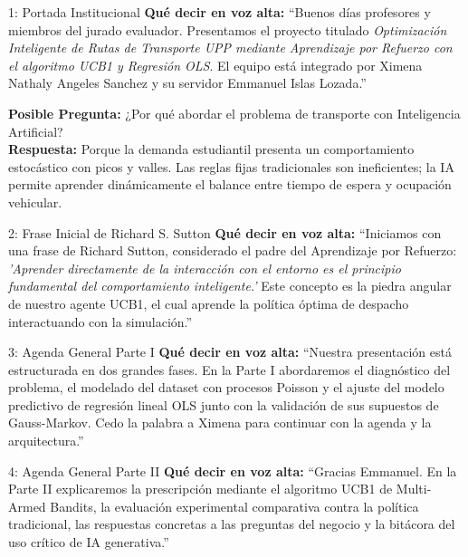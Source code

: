 \documentclass[11pt, a4paper]{article}
\begin{document}
\begin{emmanuelbox}{1: Portada Institucional}
\textbf{Qué decir en voz alta:}
``Buenos días profesores y miembros del jurado evaluador. Presentamos el proyecto titulado \textit{Optimización Inteligente de Rutas de Transporte UPP mediante Aprendizaje por Refuerzo con el algoritmo UCB1 y Regresión OLS}. El equipo está integrado por Ximena Nathaly Angeles Sanchez y su servidor Emmanuel Islas Lozada.''

\begin{defensebox}
\textbf{Posible Pregunta:} ¿Por qué abordar el problema de transporte con Inteligencia Artificial?\\
\textbf{Respuesta:} Porque la demanda estudiantil presenta un comportamiento estocástico con picos y valles. Las reglas fijas tradicionales son ineficientes; la IA permite aprender dinámicamente el balance entre tiempo de espera y ocupación vehicular.
\end{defensebox}
\end{emmanuelbox}

\begin{emmanuelbox}{2: Frase Inicial de Richard S. Sutton}
\textbf{Qué decir en voz alta:}
``Iniciamos con una frase de Richard Sutton, considerado el padre del Aprendizaje por Refuerzo: \textit{'Aprender directamente de la interacción con el entorno es el principio fundamental del comportamiento inteligente.'} Este concepto es la piedra angular de nuestro agente UCB1, el cual aprende la política óptima de despacho interactuando con la simulación.''
\end{emmanuelbox}

\begin{emmanuelbox}{3: Agenda General Parte I}
\textbf{Qué decir en voz alta:}
``Nuestra presentación está estructurada en dos grandes fases. En la Parte I abordaremos el diagnóstico del problema, el modelado del dataset con procesos Poisson y el ajuste del modelo predictivo de regresión lineal OLS junto con la validación de sus supuestos de Gauss-Markov. Cedo la palabra a Ximena para continuar con la agenda y la arquitectura.''
\end{emmanuelbox}

\begin{ximenabox}{4: Agenda General Parte II}
\textbf{Qué decir en voz alta:}
``Gracias Emmanuel. En la Parte II explicaremos la prescripción mediante el algoritmo UCB1 de Multi-Armed Bandits, la evaluación experimental comparativa contra la política tradicional, las respuestas concretas a las preguntas del negocio y la bitácora del uso crítico de IA generativa.''
\end{ximenabox}
\end{document}
